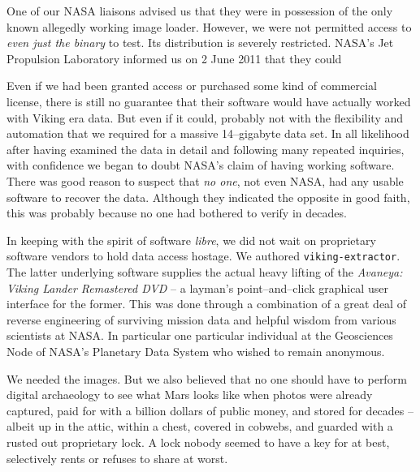 One of our NASA liaisons advised us that they were in possession of the only known allegedly working image loader. However, we were not permitted access to {\it even just the binary} to test. Its distribution is severely restricted. NASA's Jet Propulsion Laboratory informed us on 2 June 2011 that they could 

Even if we had been granted access or purchased some kind of commercial license, there is still no guarantee that their software would have actually worked with Viking era data. But even if it could, probably not with the flexibility and automation that we required for a massive 14--gigabyte data set. In all likelihood after having examined the data in detail and following many repeated inquiries, with confidence we began to doubt NASA's claim of having working software. There was good reason to suspect that {\it no one}, not even NASA, had any usable software to recover the data. Although they indicated the opposite in good faith, this was probably because no one had bothered to verify in decades.


In keeping with the spirit of software {\it libre}, we did not wait on proprietary software vendors to hold data access hostage. We authored {\tt viking-extractor}. The latter underlying software supplies the actual heavy lifting of the {\it Avaneya: Viking Lander Remastered DVD} -- a layman's point--and--click graphical user interface for the former. This was done through a combination of a great deal of reverse engineering of surviving mission data and helpful wisdom from various scientists at NASA. In particular one particular individual at the Geosciences Node of NASA's Planetary Data System who wished to remain anonymous.
    {}

We needed the images. But we also believed that no one should have to perform digital archaeology to see what Mars looks like when photos were already captured, paid for with a billion dollars of public money, and stored for decades -- albeit up in the attic, within a chest, covered in cobwebs, and guarded with a rusted out proprietary lock. A lock nobody seemed to have a key for at best, selectively rents or refuses to share at worst.

